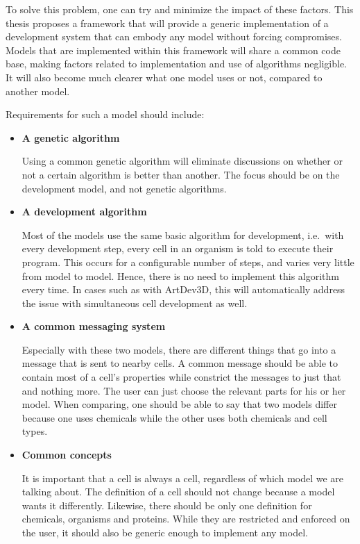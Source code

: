 To solve this problem, one can try and minimize the impact of these factors. This thesis proposes a framework that will provide a generic implementation of a development system that can embody any model without forcing compromises. Models that are implemented within this framework will share a common code base, making factors related to implementation and use of algorithms negligible. It will also become much clearer what one model uses or not, compared to another model.

Requirements for such a model should include:
\begin{itemize}
	\item\textbf{A genetic algorithm}

	Using a common genetic algorithm will eliminate discussions on whether or not a certain algorithm is better than another. The focus should be on the development model, and not genetic algorithms.

	\item\textbf{A development algorithm}

	Most of the models use the same basic algorithm for development, i.e.\ with every development step, every cell in an organism is told to execute their program. This occurs for a configurable number of steps, and varies very little from model to model. Hence, there is no need to implement this algorithm every time. In cases such as with ArtDev3D, this will automatically address the issue with simultaneous cell development as well.

	\item\textbf{A common messaging system}

	Especially with these two models, there are different things that go into a message that is sent to nearby cells. A common message should be able to contain most of a cell's properties while constrict the messages to just that and nothing more. The user can just choose the relevant parts for his or her model. When comparing, one should be able to say that two models differ because one uses chemicals while the other uses both chemicals and cell types.

	\item\textbf{Common concepts}

	It is important that a cell is always a cell, regardless of which model we are talking about. The definition of a cell should not change because a model wants it differently. Likewise, there should be only one definition for chemicals, organisms and proteins. While they are restricted and enforced on the user, it should also be generic enough to implement any model.


\end{itemize}
